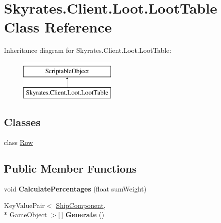 \hypertarget{class_skyrates_1_1_client_1_1_loot_1_1_loot_table}{\section{Skyrates.\-Client.\-Loot.\-Loot\-Table Class Reference}
\label{class_skyrates_1_1_client_1_1_loot_1_1_loot_table}
}
Inheritance diagram for Skyrates.\-Client.\-Loot.\-Loot\-Table\-:\begin{figure}[H]
\begin{center}
\leavevmode
\includegraphics[height=2.000000cm]{class_skyrates_1_1_client_1_1_loot_1_1_loot_table}
\end{center}
\end{figure}
\subsection*{Classes}
\begin{DoxyCompactItemize}
\item 
class \hyperlink{class_skyrates_1_1_client_1_1_loot_1_1_loot_table_1_1_row}{Row}
\end{DoxyCompactItemize}
\subsection*{Public Member Functions}
\begin{DoxyCompactItemize}
\item 
\hypertarget{class_skyrates_1_1_client_1_1_loot_1_1_loot_table_aa7489e9d16bf34c00b173e475a1cb9a7}{void {\bfseries Calculate\-Percentages} (float sum\-Weight)}\label{class_skyrates_1_1_client_1_1_loot_1_1_loot_table_aa7489e9d16bf34c00b173e475a1cb9a7}

\item 
\hypertarget{class_skyrates_1_1_client_1_1_loot_1_1_loot_table_aca7a0a201797676ec56c3fecd8fa4d91}{Key\-Value\-Pair$<$ \hyperlink{class_skyrates_1_1_client_1_1_ship_1_1_ship_component}{Ship\-Component}, \\*
Game\-Object $>$\mbox{[}$\,$\mbox{]} {\bfseries Generate} ()}\label{class_skyrates_1_1_client_1_1_loot_1_1_loot_table_aca7a0a201797676ec56c3fecd8fa4d91}

\end{DoxyCompactItemize}
